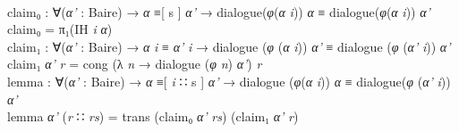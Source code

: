 \documentclass{entcs} \usepackage{prentcsmacro}
\newcommand{\AgdaFontStyle}[1]{\textsf{#1}}
\newcommand{\AgdaBoundFontStyle}[1]{\textit{#1}}
\newcommand{\AgdaSymbol}      [1]{\textcolor{AgdaSymbol}{#1}}
\newcommand{\AgdaBound}    [1]{\AgdaBoundFontStyle{\textcolor{AgdaBound}{#1}}}
\newcommand{\AgdaInductiveConstructor}[1]
    {\AgdaFontStyle{\textcolor{AgdaInductiveConstructor}{#1}}}
\newcommand{\AgdaDatatype} [1]{\AgdaFontStyle{\textcolor{AgdaDatatype}{#1}}}
\newcommand{\AgdaFunction} [1]{\AgdaFontStyle{\textcolor{AgdaFunction}{#1}}}
\newcommand{\AgdaIndent}[1]{\quad}
\newcommand{\AgdaCodeStyle}{\small}
\newenvironment{code}%
{\noindent\AgdaCodeStyle\pboxed}%
{\endpboxed\par\noindent%
\ignorespacesafterend}
\begin{document}
\begin{code}
\\
\>[0]\AgdaIndent{4}{}\<[4]%
\>[4]\AgdaFunction{claim₀} \AgdaSymbol{:} \AgdaSymbol{∀(}\AgdaBound{α'} \AgdaSymbol{:} \AgdaFunction{Baire}\AgdaSymbol{)} \AgdaSymbol{→} \AgdaBound{α} \AgdaDatatype{≡[} \AgdaFunction{s} \AgdaDatatype{]} \AgdaBound{α'} \AgdaSymbol{→} \AgdaFunction{dialogue}\AgdaSymbol{(}\AgdaBound{φ}\AgdaSymbol{(}\AgdaBound{α} \AgdaBound{i}\AgdaSymbol{))} \AgdaBound{α} \AgdaDatatype{≡} \AgdaFunction{dialogue}\AgdaSymbol{(}\AgdaBound{φ}\AgdaSymbol{(}\AgdaBound{α} \AgdaBound{i}\AgdaSymbol{))} \AgdaBound{α'}\<%
\\
\>[0]\AgdaIndent{4}{}\<[4]%
\>[4]\AgdaFunction{claim₀} \AgdaSymbol{=} \AgdaFunction{π₁}\AgdaSymbol{(}\AgdaFunction{IH} \AgdaBound{i} \AgdaBound{α}\AgdaSymbol{)}\<%
\\
\>[0]\AgdaIndent{4}{}\<[4]%
\>[4]\AgdaFunction{claim₁} \AgdaSymbol{:} \AgdaSymbol{∀(}\AgdaBound{α'} \AgdaSymbol{:} \AgdaFunction{Baire}\AgdaSymbol{)} \AgdaSymbol{→} \AgdaBound{α} \AgdaBound{i} \AgdaDatatype{≡} \AgdaBound{α'} \AgdaBound{i} \AgdaSymbol{→} \AgdaFunction{dialogue} \AgdaSymbol{(}\AgdaBound{φ} \AgdaSymbol{(}\AgdaBound{α} \AgdaBound{i}\AgdaSymbol{))} \AgdaBound{α'} \AgdaDatatype{≡} \AgdaFunction{dialogue} \AgdaSymbol{(}\AgdaBound{φ} \AgdaSymbol{(}\AgdaBound{α'} \AgdaBound{i}\AgdaSymbol{))} \AgdaBound{α'}\<%
\\
\>[0]\AgdaIndent{4}{}\<[4]%
\>[4]\AgdaFunction{claim₁} \AgdaBound{α'} \AgdaBound{r} \AgdaSymbol{=} \AgdaFunction{cong} \AgdaSymbol{(λ} \AgdaBound{n} \AgdaSymbol{→} \AgdaFunction{dialogue} \AgdaSymbol{(}\AgdaBound{φ} \AgdaBound{n}\AgdaSymbol{)} \AgdaBound{α'}\AgdaSymbol{)} \AgdaBound{r}\<%
\\
\>[0]\AgdaIndent{4}{}\<[4]%
\>[4]\AgdaFunction{lemma} \AgdaSymbol{:} \AgdaSymbol{∀(}\AgdaBound{α'} \AgdaSymbol{:} \AgdaFunction{Baire}\AgdaSymbol{)} \AgdaSymbol{→} \AgdaBound{α} \AgdaDatatype{≡[} \AgdaBound{i} \AgdaInductiveConstructor{∷} \AgdaFunction{s} \AgdaDatatype{]} \AgdaBound{α'} \<[45]%
\>[45]\AgdaSymbol{→} \AgdaFunction{dialogue} \AgdaSymbol{(}\AgdaBound{φ}\AgdaSymbol{(}\AgdaBound{α} \AgdaBound{i}\AgdaSymbol{))} \AgdaBound{α} \AgdaDatatype{≡} \AgdaFunction{dialogue}\AgdaSymbol{(}\AgdaBound{φ} \AgdaSymbol{(}\AgdaBound{α'} \AgdaBound{i}\AgdaSymbol{))} \AgdaBound{α'}\<%
\\
\>[0]\AgdaIndent{4}{}\<[4]%
\>[4]\AgdaFunction{lemma} \AgdaBound{α'} \AgdaSymbol{(}\AgdaBound{r} \AgdaInductiveConstructor{∷} \AgdaBound{rs}\AgdaSymbol{)} \AgdaSymbol{=} \AgdaFunction{trans} \AgdaSymbol{(}\AgdaFunction{claim₀} \AgdaBound{α'} \AgdaBound{rs}\AgdaSymbol{)} \AgdaSymbol{(}\AgdaFunction{claim₁} \AgdaBound{α'} \AgdaBound{r}\AgdaSymbol{)}\<%
\\
\>\<\end{code}
\end{document}
